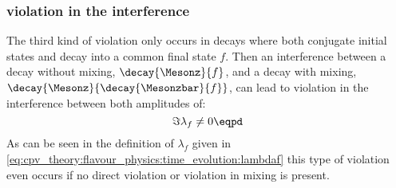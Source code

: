 \subsubsection[\CP violation in the interference]{\CPbfsf violation in the interference}
\label{sec:cpv_theory:flavour_physics:cpv_classification:interference}

The third kind of \CP violation only occurs in decays where both \CP conjugate
initial states \Mesonz and \Mesonzbar decay into a common final state $f$. Then
an interference between a decay without mixing, $\decay{\Mesonz}{f}$, and a
decay with mixing, $\decay{\Mesonz}{\decay{\Mesonzbar}{f}}$, can lead to \CP
violation in the interference between both amplitudes of:
%
\begin{equation}
  \Im \lambda_f \neq 0 \eqpd
\end{equation}
%
As can be seen in the definition of $\lambda_f$ given in
\cref{eq:cpv_theory:flavour_physics:time_evolution:lambdaf} this type of \CP
violation even occurs if no direct \CP violation or \CP violation in mixing is
present.
